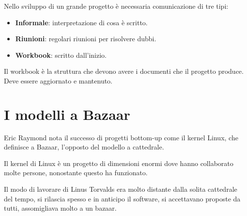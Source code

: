 \documentclass[a4paper,12pt,titlepage,oneside]{book}
\begin{document}
Nello sviluppo di un grande progetto è necessaria comunicazione di tre tipi:
\begin{itemize}
    \item \textbf{Informale}: interpretazione di cosa è scritto.
    \item \textbf{Riunioni}: regolari riunioni per risolvere dubbi.
    \item \textbf{Workbook}: scritto dall'inizio.
\end{itemize}

Il workbook è la struttura che devono avere i documenti che il progetto produce. Deve essere aggiornato e mantenuto.

\chapter{I modelli a Bazaar}
Eric Raymond nota il successo di progetti bottom-up come il kernel Linux, che definisce a Bazaar, l'opposto del modello a cattedrale.

Il kernel di Linux è un progetto di dimensioni enormi dove hanno collaborato molte persone, nonostante questo ha funzionato.

Il modo di lavorare di Linus Torvalds era molto distante dalla solita cattedrale del tempo, si rilascia spesso e in anticipo il software, si accettavano proposte da tutti, assomigliava molto a un bazaar.
\end{document}
